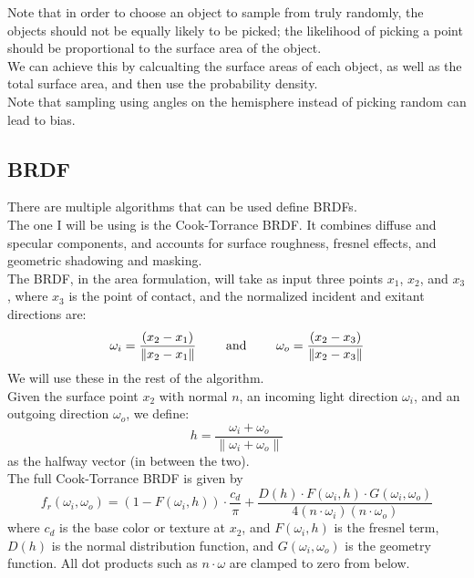 \documentclass[12pt]{article}
\begin{document}
Note that in order to choose an object to sample
from truly randomly, the objects should not be equally
likely to be picked; the likelihood of picking a point
should be proportional to the surface area of the object. \\
We can achieve this by calcualting the surface areas
of each object, as well as the total surface area,
and then use the probability density. \\

Note that sampling using angles on the hemisphere 
instead of picking random can lead to bias. \\

\newpage

\subsection*{BRDF}

There are multiple algorithms that can be used define
BRDFs. \\
The one I will be using is the Cook-Torrance BRDF.
It combines diffuse and specular components, 
and accounts for surface roughness, 
fresnel effects, and geometric shadowing and masking. \\

The BRDF, in the area formulation, will take as input
three points $x_1$, $x_2$, and $x_3$,
where $x_3$ is the point of contact, and
the normalized incident and exitant directions are:
\[ \omega_i = \dfrac{(x_2 - x_1)}{\|x_2 - x_1\|} 
\qquad \text{ and } \qquad 
\omega_o = \dfrac{(x_2 - x_3)}{\|x_2 - x_3\|} \]
We will use these in the rest of the algorithm. \\

Given the surface point $x_2$ with normal $n$, 
an incoming light direction $\omega_i$, 
and an outgoing direction $\omega_o$, 
we define:
\[ h = \frac{\omega_i + \omega_o}
{\|\omega_i + \omega_o\|} \]
as the halfway vector (in between the two). \\

The full Cook-Torrance BRDF is given by
\[f_r(\omega_i, \omega_o) = (1 - F(\omega_i, h)) 
\cdot \frac{c_d}{\pi}
+ \frac{D(h) \cdot F(\omega_i, h) \cdot 
G(\omega_i, \omega_o)}{4 (n \cdot \omega_i)
(n \cdot \omega_o)} \]
where $c_d$ is the base color or texture at $x_2$, 
and $ F(\omega_i, h)$ is the fresnel term, 
$D(h)$ is the normal distribution function, 
and $ G(\omega_i, \omega_o) $ is the geometry function. 
All dot products such as $ n \cdot \omega $ 
are clamped to zero from below. \\
\end{document}
